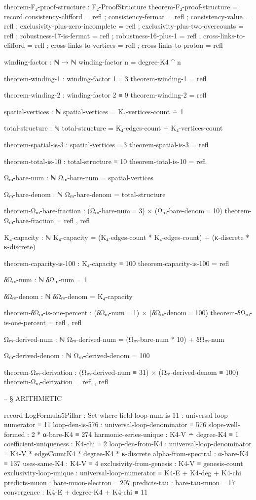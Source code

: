 \documentclass[11pt,a4paper]{book}
\begin{document}
\begin{code}
theorem-F₂-proof-structure : F₂-ProofStructure
theorem-F₂-proof-structure = record
  { consistency-clifford = refl
  ; consistency-fermat = refl
  ; consistency-value = refl
  ; exclusivity-plus-zero-incomplete = refl
  ; exclusivity-plus-two-overcounts = refl
  ; robustness-17-is-fermat = refl
  ; robustness-16-plus-1 = refl
  ; cross-links-to-clifford = refl
  ; cross-links-to-vertices = refl
  ; cross-links-to-proton = refl
  }

winding-factor : ℕ → ℕ
winding-factor n = degree-K4 ^ n

theorem-winding-1 : winding-factor 1 ≡ 3
theorem-winding-1 = refl

theorem-winding-2 : winding-factor 2 ≡ 9
theorem-winding-2 = refl


spatial-vertices : ℕ
spatial-vertices = K₄-vertices-count ∸ 1

total-structure : ℕ
total-structure = K₄-edges-count + K₄-vertices-count

theorem-spatial-is-3 : spatial-vertices ≡ 3
theorem-spatial-is-3 = refl

theorem-total-is-10 : total-structure ≡ 10
theorem-total-is-10 = refl

Ωₘ-bare-num : ℕ
Ωₘ-bare-num = spatial-vertices

Ωₘ-bare-denom : ℕ
Ωₘ-bare-denom = total-structure

theorem-Ωₘ-bare-fraction : (Ωₘ-bare-num ≡ 3) × (Ωₘ-bare-denom ≡ 10)
theorem-Ωₘ-bare-fraction = refl , refl

K₄-capacity : ℕ
K₄-capacity = (K₄-edges-count * K₄-edges-count) + (κ-discrete * κ-discrete)

theorem-capacity-is-100 : K₄-capacity ≡ 100
theorem-capacity-is-100 = refl

δΩₘ-num : ℕ
δΩₘ-num = 1

δΩₘ-denom : ℕ
δΩₘ-denom = K₄-capacity

theorem-δΩₘ-is-one-percent : (δΩₘ-num ≡ 1) × (δΩₘ-denom ≡ 100)
theorem-δΩₘ-is-one-percent = refl , refl

Ωₘ-derived-num : ℕ
Ωₘ-derived-num = (Ωₘ-bare-num * 10) + δΩₘ-num

Ωₘ-derived-denom : ℕ
Ωₘ-derived-denom = 100

theorem-Ωₘ-derivation : (Ωₘ-derived-num ≡ 31) × (Ωₘ-derived-denom ≡ 100)
theorem-Ωₘ-derivation = refl , refl


-- § ARITHMETIC

record LogFormula5Pillar : Set where
  field
    loop-num-is-11         : universal-loop-numerator ≡ 11
    loop-den-is-576        : universal-loop-denominator ≡ 576
    slope-well-formed      : 2 * α-bare-K4 ≡ 274
    harmonic-series-unique : K4-V ∸ degree-K4 ≡ 1
    coefficient-uniqueness : K4-chi ≡ 2
    loop-den-from-K4       : universal-loop-denominator ≡ K4-V * edgeCountK4 * degree-K4 * κ-discrete
    alpha-from-spectral    : α-bare-K4 ≡ 137
    uses-same-K4           : K4-V ≡ 4
    exclusivity-from-genesis : K4-V ≡ genesis-count
    exclusivity-loop-unique  : universal-loop-numerator ≡ K4-E + K4-deg + K4-chi
    predicts-muon          : bare-muon-electron ≡ 207
    predicts-tau           : bare-tau-muon ≡ 17
    convergence            : K4-E + degree-K4 + K4-chi ≡ 11


\end{code}
\end{document}
